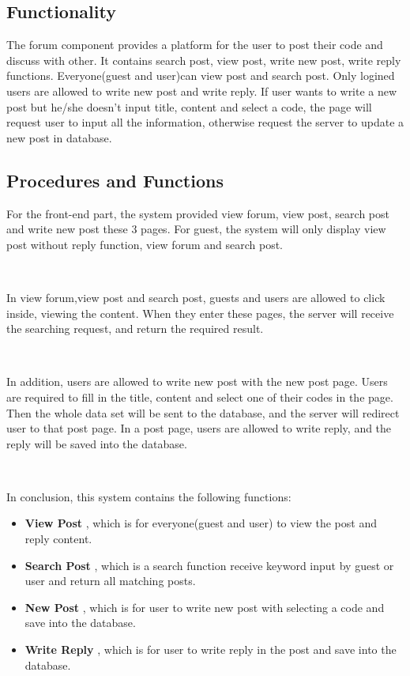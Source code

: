 \subsection{Functionality}
The forum component provides a platform for the user to post their code and discuss with other. It contains search post, view post, write new post, write reply functions. Everyone(guest and user)can view post and search post. Only logined users are allowed to write new post and write reply. If user wants to write a new post but he/she doesn't input title, content and select a code, the page will request user to input all the information, otherwise request the server to update a new post in database.

\subsection{Procedures and Functions}
For the front-end part, the system provided view forum, view post, search post and write new post these 3 pages. For guest, the system will only display view post without reply function, view forum and search post.

~

In view forum,view post and search post, guests and users are allowed to click inside, viewing the content. When they enter these pages, the server will receive the searching request, and return the required result.

~

In addition, users are allowed to write new post with the new post page. Users are required to fill in the title, content and select one of their codes in the page. Then the whole data set will be sent to the database, and the server will redirect user to that post page. In a post page, users are allowed to write reply, and the reply will be saved into the database.

~

In conclusion, this system contains the following functions:

\begin{itemize}

\item
\textbf{View Post}
, which is for everyone(guest and user) to view the post and reply content.\newline

\item
\textbf{Search Post}
, which is a search function receive keyword input by guest or user and return all matching posts.\newline

\item
\textbf{New Post}
, which is for user to write new post with selecting a code and save into the database.\newline

\item
\textbf{Write Reply}
, which is for user to write reply in the post and save into the database.\newline

\end{itemize}
\clearpage

